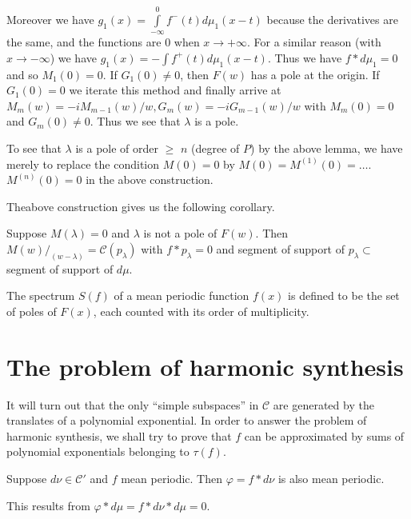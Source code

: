 Moreover we have $g_1 (x) = \int\limits_{-\infty}^0 f^{-} (t) d\mu_1
(x - t)$ because the derivatives are the same, and the functions are
$0$ when $x \rightarrow + \infty$. For a similar reason (with $x
\rightarrow -\infty$) we have $g_1 (x) = - \int f^+ (t) d \mu_1
(x-t)$. Thus we have $f * d\mu_1 = 0$ and so $M_1 (0) = 0$. If $G_1
(0) \neq 0$, then $F(w)$ has a pole at the origin. If $G_1 (0) = 0$ we
iterate this method and finally arrive at $M_m (w) = -iM_{m-1} (w)/ w,
G_m (w) = -iG_{m-1} (w)/w$ with $M_m (0) = 0$ and $G_m (0) \neq
0$. Thus we see that $\lambda$ is a pole. 

To see that $\lambda$ is a pole of order $\geq$ $n$ (degree of $P$) by
the above lemma, we have merely to replace the condition $M(0) = 0$ by
$M(0) = M^{(1)} (0) = \ldots$. $M^{(n)} (0) = 0$ in the above
construction. 

The\pageoriginale above construction gives us the following corollary.

\begin{coro*}%
  Suppose $M(\lambda) = 0$ and $\lambda$ is not a pole of $F(w)$. Then\break
  $M(w)/_{(w - \lambda )} = \mathscr{C} (p_\lambda )$ with $f *
  p_\lambda = 0$ and segment of support of $p_{\lambda} \subset$
  segment of support of $d \mu$. 
\end{coro*}

\begin{defi*}
 The spectrum $S(f)$ of a mean periodic function $f(x)$ is defined to
 be the set of poles of $F(x)$, each counted with its order of
 multiplicity. 
\end{defi*}

\section{The problem of harmonic synthesis}\label{chap4:sec3}%

It will turn out that the only ``simple subspaces'' in $\mathscr{C}$ are
generated by the translates of a polynomial exponential. In order to
answer the problem of harmonic synthesis, we shall try to prove that
$f$ can be approximated by sums of polynomial exponentials belonging
to $\tau (f)$. 

\begin{lemma*}
 Suppose $d \nu \in \mathscr{C}'$ and $f$ mean periodic. Then $\varphi = f
 * d \nu$ is also mean periodic. 
\end{lemma*}

This results from $\varphi * d\mu = f * d\nu * d \mu = 0$.

